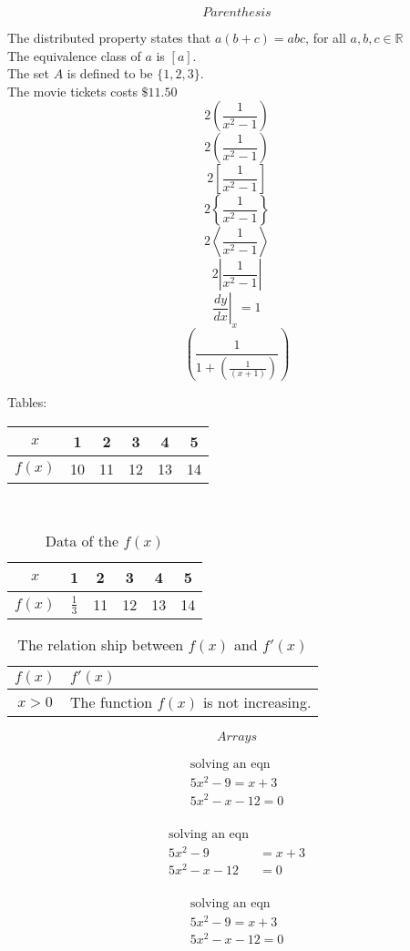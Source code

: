 \documentclass[12pt]{article}
\begin{document}
$$Parenthesis$$

The distributed property states that $a(b+c) = abc$, for all $a,b,c \in\mathbb{R}$\\[6pt]
The equivalence class of $a$ is $[a]$.\\[6pt]
The set $A$ is defined to be $\{1, 2, 3\}$.\\[6pt]
The movie tickets costs $\$11.50$
$$ 2(\frac{1}{x^2 - 1})$$
$$ 2\left(\dfrac{1}{x^2 - 1}\right)$$
$$ 2\left[\dfrac{1}{x^2 - 1}\right]$$
$$ 2\left\{\dfrac{1}{x^2 - 1}\right\}$$
$$ 2\left\langle \dfrac{1}{x^2 - 1}\right\rangle$$
$$ 2\left|\dfrac{1}{x^2 - 1}\right|$$
$$\left.\frac{dy}{dx}\right|_x=1$$
$$\left(\frac{1}{1+\left(\frac{1}{(x+1)}\right)}\right)$$


Tables: \\

\begin{tabular}{|c||c|c|c|c|c|}
\hline
$x$&1&2&3&4&5\\\hline
$f(x)$&10&11&12&13&14\\\hline

\end{tabular}\\
\vspace{1cm}

\begin{table}[H]
\centering
\def\arraystretch{1.5}
\begin{tabular}{|c||c|c|c|c|c|}
\hline
$x$&1&2&3&4&5\\\hline
$f(x)$&$\frac{1}{3}$&11&12&13&14\\\hline

\end{tabular}
\caption{Data of the $f(x)$}
\end{table}

\begin{table}[H]
\caption{The relation ship between $f(x)$ and $f'(x)$ }
\centering
\def\arraystretch{1.5}
\begin{tabular}{|c|l|}
\hline
$f(x)$&$f'(x)$\\\hline
$x>0$ & The function $f(x)$ is not increasing.\\\hline

\end{tabular}

\end{table}

$$ Arrays $$

\begin{align}
\text{solving an eqn}\\
5x^2 -9 = x+3 \\
5x^2 - x- 12 = 0 \\
\end{align}

\begin{align*}
\text{solving an eqn}\\
5x^2 -9 &= x+3 \\
5x^2 - x- 12 &= 0 \\
\end{align*}

\begin{align}
\text{solving an eqn}\\
5x^2 -9 = x+3 \\
5x^2 - x- 12 = 0 \\
\end{align}
\end{document}

